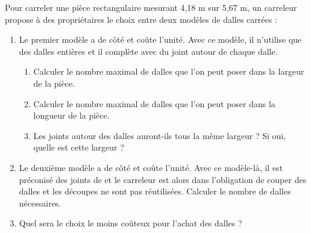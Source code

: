 {\begin{exercice}[CRPE 2008 G3] %
   Pour carreler une pièce rectangulaire mesurant 4,18 m sur 5,67 m, un carreleur propose à des propriétaires le choix entre deux modèles de dalles carrées :
   \begin{enumerate}
      \item Le premier modèle a  de côté et coûte  l'unité. Avec ce modèle, il n'utilise que des dalles entières et il complète avec du joint autour de chaque dalle.
      \begin{enumerate}
         \item Calculer le nombre maximal de dalles que l'on peut poser dans la largeur de la pièce.
         \item Calculer le nombre maximal de dalles que l'on peut poser dans la longueur de la pièce.
         \item Les joints autour des dalles auront-ils tous la même largeur ? Si oui, quelle est cette largeur ?
      \end{enumerate}
      \item Le deuxième modèle a  de côté et coûte  l'unité. Avec ce modèle-là, il est préconisé des joints de  et le carreleur est alors dans l'obligation de couper des dalles et les découpes ne sont pas réutilisées. Calculer le nombre de dalles nécessaires.
      \item Quel sera le choix le moins coûteux pour l'achat des dalles ?
   \end{enumerate}
\end{exercice}

}
